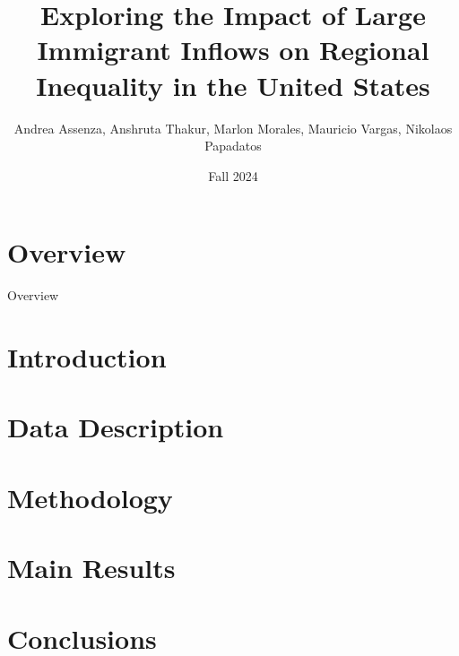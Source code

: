 \documentclass[8pt]{beamer}
\title{Exploring the Impact of Large Immigrant Inflows on Regional Inequality in the United States}
\date{Fall 2024}
\author{
    Andrea Assenza,
    Anshruta Thakur,
    Marlon Morales,
    Mauricio Vargas,
    Nikolaos Papadatos
}
\begin{document}
\insertTitleSlide

\section{Overview}
\label{section:overview}
\begin{frame}{Overview}
    \tableofcontents
\end{frame}

\section{Introduction}
    

\section{Data Description}
    

\section{Methodology}
    

\section{Main Results}
    

\section{Conclusions}
    


\insertLastSlide
\end{document}
